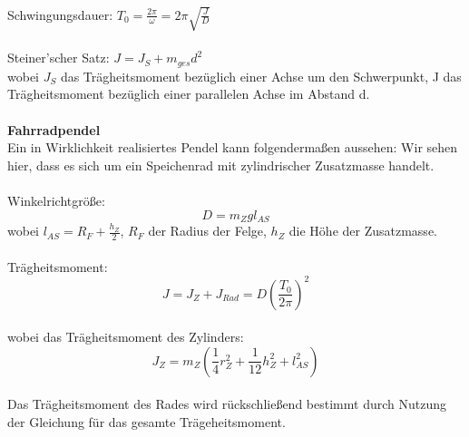 \documentclass{article}
\begin{document}
\\
Schwingungsdauer: $T_0=\frac{2\pi}{\omega}=2\pi\sqrt{\frac{J}{D}}$\\
\\
Steiner'scher Satz: $J = J_S + m_{ges} d^2$\\
wobei $J_S$ das Trägheitsmoment bezüglich einer Achse um den Schwerpunkt, J das Trägheitsmoment bezüglich einer parallelen Achse im Abstand d.\\
\\
\textbf{Fahrradpendel}\\
Ein in Wirklichkeit realisiertes Pendel kann folgendermaßen aussehen:
Wir sehen hier, dass es sich um ein Speichenrad mit zylindrischer Zusatzmasse handelt.\\
\\
Winkelrichtgröße:
$$D=m_Z g l_{AS}$$
wobei $l_{AS}=R_F + \frac{h_Z}{2}$, $R_F$ der Radius der Felge, $h_Z$ die Höhe der Zusatzmasse.\\
\\
Trägheitsmoment:
\begin{equation*}
J = J_Z + J_{Rad} = D (\frac{T_0}{2\pi})^2
\end{equation*}
\\
wobei das Trägheitsmoment des Zylinders:
\begin{equation*}
J_Z = m_Z(\frac{1}{4}r^2_Z + \frac{1}{12}h^2_Z+l^2_{AS})
\end{equation*}
\\
Das Trägheitsmoment des Rades wird rückschließend bestimmt durch Nutzung der Gleichung für das gesamte Trägeheitsmoment.
\\
\end{document}
